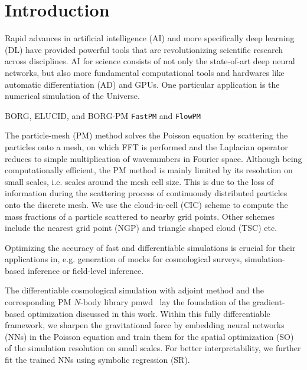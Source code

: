 \documentclass[modern, trackchanges, dvipsnames]{aastex631}
\newcommand{\pmwd}{{\usefont{T1}{nova}{m}{sl}pmwd}}
\begin{document}
\vspace{1em}
\section{Introduction}

Rapid advances in artificial intelligence (AI) and more specifically
deep learning (DL) have provided powerful tools that are revolutionizing
scientific research across disciplines.
AI for science consists of not only the state-of-art deep neural
networks, but also more fundamental computational tools and hardwares
like automatic differentiation (AD) and GPUs.
One particular application is the numerical simulation of the Universe.

BORG, ELUCID, and BORG-PM \citep{BORG, ELUCID, BORG-PM}
\texttt{FastPM} and \texttt{FlowPM} \citep{FastPM, vmad, SeljakEtAl2017, FlowPM}


The particle-mesh (PM) method solves the Poisson equation by scattering
the particles onto a mesh, on which FFT is performed and the Laplacian
operator reduces to simple multiplication of wavenumbers in Fourier
space.
Although being computationally efficient, the PM method is mainly
limited by its resolution on small scales, i.e. scales around the mesh
cell size.
This is due to the loss of information during the scattering process of
continuously distributed particles onto the discrete mesh.
We use the cloud-in-cell (CIC) scheme \citep{HockneyEastwood1988} to
compute the mass fractions of a particle scattered to nearby grid
points.
Other schemes include the nearest grid point (NGP) and triangle shaped
cloud (TSC) etc.

Optimizing the accuracy of fast and differentiable simulations is
crucial for their applications in, e.g. generation of mocks for
cosmological surveys, simulation-based inference or field-level
inference.

The differentiable cosmological simulation with adjoint method
\citep{Li2022a} and the corresponding PM $N$-body library \pmwd\
\citep{Li2022b} lay the foundation of the gradient-based optimization
discussed in this work.
Within this fully differentiable framework, we sharpen the gravitational
force by embedding neural networks (NNs) in the Poisson equation and
train them for the spatial optimization (SO) of the simulation
resolution on small scales.
For better interpretability, we further fit the trained NNs using
symbolic regression (SR).
\end{document}
